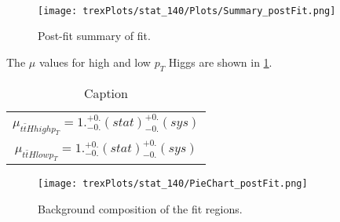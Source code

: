 \begin{figure}[h!]
    \\
    \caption{}
    \label{fig:sigRegions140}
\end{figure}

\begin{figure}[h!]
    \center
    \texttt{[image: trexPlots/stat\_140/Plots/Summary\_postFit.png]}
    \caption{Post-fit summary of fit.}
    \label{fig:Summary140}
\end{figure}

The $\mu$ values for high and low $p_T$ Higgs are shown in \ref{tab:mu140}.

\begin{table}[H]
  \centering
  \begin{tabular}{c}
     $\mu_{t\bar{t}H high p_T} = 1.^{+0.}_{-0.}(stat)^{+0.}_{-0.}(sys)$ \\
     $\mu_{t\bar{t}H low p_T} = 1.^{+0.}_{-0.}(stat)^{+0.}_{-0.}(sys)$ \\
  \end{tabular}
  \caption{Caption}
  \label{tab:mu140}
\end{table}

\begin{figure}[h!]
    \centering                                                                                                               
    \texttt{[image: trexPlots/stat\_140/PieChart\_postFit.png]}
    \caption{Background composition of the fit regions.}
    \label{fig:pieChart140}
\end{figure}

